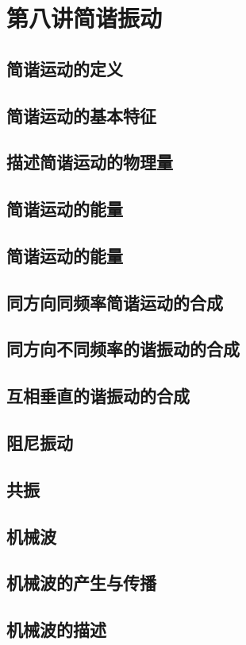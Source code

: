 \documentclass[UTF8]{article}
\begin{document}
\section{第八讲\;\;简谐振动}
\subsection{简谐运动的定义}
\subsection{简谐运动的基本特征}
\subsection{描述简谐运动的物理量}
\subsection{简谐运动的能量}
\subsection{简谐运动的能量}
\subsection{同方向同频率简谐运动的合成}
\subsection{同方向不同频率的谐振动的合成}
\subsection{互相垂直的谐振动的合成}
\subsection{阻尼振动}
\subsection{共振}
\subsection{机械波}
\subsection{机械波的产生与传播}
\subsection{机械波的描述}
\end{document}
